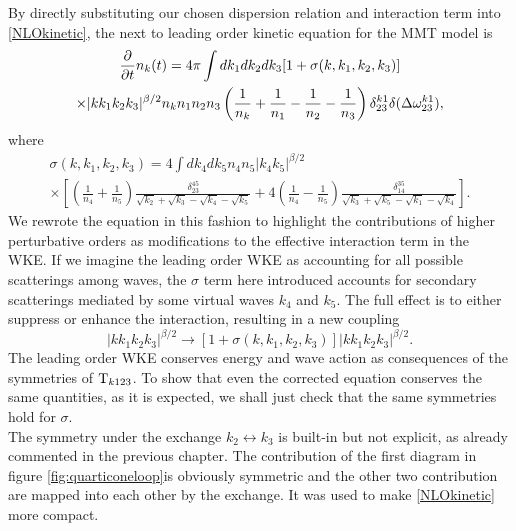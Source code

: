     By directly substituting our chosen dispersion relation and interaction term into \eqref{NLOkinetic}, the next to leading order kinetic equation for the MMT 
    model is 
    \begin{multline}
        \frac{\partial}{\partial t}n_k(t) = 4\pi \int dk_1dk_2dk_3[1 + \sigma(k,k_1,k_2,k_3)]\\
        \times |kk_1k_2k_3|^{\beta/2} n_kn_1n_2n_3 \left(\frac{1}{n_k} +\frac{1}{n_1}-
        \frac{1}{n_2}-\frac{1}{n_3}\right)\delta_{23}^{k1}\delta(\Delta{\omega}^{k1}_{23}), 
        \label{wke_nlo}
    \end{multline}
    where 
    \begin{multline}
        \sigma(k,k_1,k_2,k_3) =  4 \int dk_4dk_5n_4n_5|k_4k_5|^{\beta/2} \\
        \times \left[\left( \frac{1}{n_4}+\frac{1}{n_5} \right) 
        \frac{\delta_{23}^{45}}{\sqrt{k_2}+\sqrt{k_3}-\sqrt{k_4}-\sqrt{k_5}} + 4\left( \frac{1}{n_4}-\frac{1}{n_5} \right) 
        \frac{\delta_{14}^{35}}{\sqrt{k_3}+\sqrt{k_5}-\sqrt{k_1}-\sqrt{k_4}}\right].
        \label{sigma}
    \end{multline}
    We rewrote the equation in this fashion to highlight the contributions of higher perturbative orders as modifications to the effective interaction term in the WKE.
    If we imagine the leading order WKE as accounting for all possible scatterings among waves, the $\sigma$ term here introduced accounts for secondary scatterings 
    mediated by some virtual waves $k_4$ and $k_5$. The full effect is to either suppress or enhance the interaction, resulting in a new coupling 
    \begin{equation*}
    |kk_1k_2k_3|^{\beta/2} \longrightarrow [1 + \sigma(k,k_1,k_2,k_3)]|kk_1k_2k_3|^{\beta/2} . 
    \end{equation*}
    The leading order WKE conserves energy and wave action as consequences of the symmetries of $\mathrm{T}_{k123}$. To show that even the corrected equation 
    conserves the same quantities, as it is expected, we shall just check that the same symmetries hold for $\sigma$.\\
    The symmetry under the exchange $k_2 \leftrightarrow k_3$ is built-in but not explicit, as already commented in the previous chapter. The contribution of the 
    first diagram in figure \ref{fig:quarticoneloop}is obviously symmetric and the other two contribution are mapped into each other by the exchange. It was used to make
    \eqref{NLOkinetic} more compact. \\

